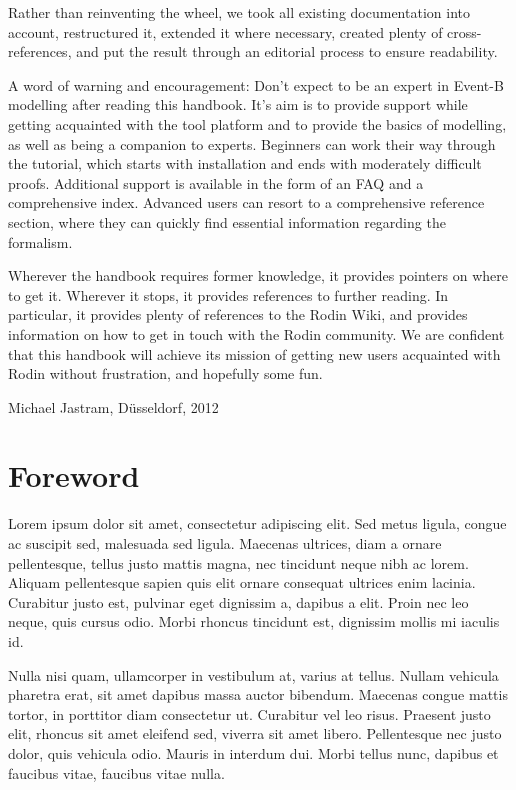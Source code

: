 \documentclass[12pt]{book}
\begin{document}
Rather than reinventing the wheel, we took all existing documentation into account, restructured it, extended it where necessary, created plenty of cross-references, and put the result through an editorial process to ensure readability.

A word of warning and encouragement: Don't expect to be an expert in Event-B modelling after reading this handbook.  It's aim is to provide support while getting acquainted with the tool platform and to provide the basics of modelling, as well as being a companion to experts.  Beginners can work their way through the tutorial, which starts with installation and ends with moderately difficult proofs.  Additional support is available in the form of an FAQ and a comprehensive index.  Advanced users can resort to a comprehensive reference section, where they can quickly find essential information regarding the formalism.

Wherever the handbook requires former knowledge, it provides pointers on where to get it.  Wherever it stops, it provides references to further reading.  In particular, it provides plenty of references to the Rodin Wiki, and provides information on how to get in touch with the Rodin community.  We are confident that this handbook will achieve its mission of getting new users acquainted with Rodin without frustration, and hopefully some fun.

\begin{flushright}
  Michael Jastram, Düsseldorf, 2012
\end{flushright}

\chapter*{Foreword}
\label{foreword}

Lorem ipsum dolor sit amet, consectetur adipiscing elit. Sed metus ligula, congue ac suscipit sed, malesuada sed ligula. Maecenas ultrices, diam a ornare pellentesque, tellus justo mattis magna, nec tincidunt neque nibh ac lorem. Aliquam pellentesque sapien quis elit ornare consequat ultrices enim lacinia. Curabitur justo est, pulvinar eget dignissim a, dapibus a elit. Proin nec leo neque, quis cursus odio. Morbi rhoncus tincidunt est, dignissim mollis mi iaculis id. 

Nulla nisi quam, ullamcorper in vestibulum at, varius at tellus. Nullam vehicula pharetra erat, sit amet dapibus massa auctor bibendum. Maecenas congue mattis tortor, in porttitor diam consectetur ut. Curabitur vel leo risus. Praesent justo elit, rhoncus sit amet eleifend sed, viverra sit amet libero. Pellentesque nec justo dolor, quis vehicula odio. Mauris in interdum dui. Morbi tellus nunc, dapibus et faucibus vitae, faucibus vitae nulla.
\end{document}
